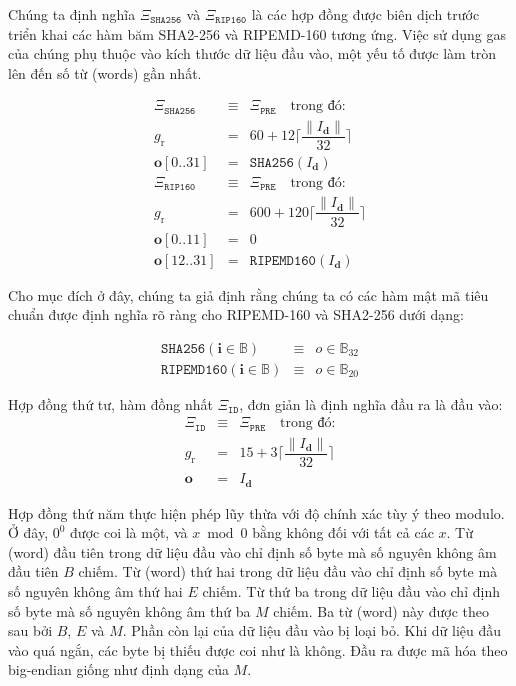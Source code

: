 \documentclass[9pt,oneside]{amsart}
\begin{document}
Chúng ta định nghĩa $\Xi_{\mathtt{SHA256}}$ và $\Xi_{\mathtt{RIP160}}$ là các hợp đồng được biên dịch trước triển khai các hàm băm SHA2-256 và RIPEMD-160 tương ứng. Việc sử dụng gas của chúng phụ thuộc vào kích thước dữ liệu đầu vào, một yếu tố được làm tròn lên đến số từ (words) gần nhất.

\begin{eqnarray}
\Xi_{\mathtt{SHA256}} &\equiv& \Xi_{\mathtt{PRE}} \quad \text{trong đó:} \\
g_{\mathrm{r}} &=& 60 + 12\Big\lceil \dfrac{\lVert I_{\mathbf{d}} \rVert}{32} \Big\rceil\\
\mathbf{o}[0..31] &=& \mathtt{SHA256}(I_{\mathbf{d}})\\
\Xi_{\mathtt{RIP160}} &\equiv& \Xi_{\mathtt{PRE}} \quad \text{trong đó:} \\
g_{\mathrm{r}} &=& 600 + 120\Big\lceil \dfrac{\lVert I_{\mathbf{d}} \rVert}{32} \Big\rceil\\
\mathbf{o}[0..11] &=& 0 \\
\mathbf{o}[12..31] &=& \mathtt{RIPEMD160}(I_{\mathbf{d}})
\end{eqnarray}

Cho mục đích ở đây, chúng ta giả định rằng chúng ta có các hàm mật mã tiêu chuẩn được định nghĩa rõ ràng cho RIPEMD-160 và SHA2-256 dưới dạng:

\begin{eqnarray}
\mathtt{SHA256}(\mathbf{i} \in \mathbb{B}) & \equiv & o \in \mathbb{B}_{32} \\
\mathtt{RIPEMD160}(\mathbf{i} \in \mathbb{B}) & \equiv & o \in \mathbb{B}_{20}
\end{eqnarray}

Hợp đồng thứ tư, hàm đồng nhất $\Xi_{\mathtt{ID}}$, đơn giản là định nghĩa đầu ra là đầu vào:
\begin{eqnarray}
\Xi_{\mathtt{ID}} &\equiv& \Xi_{\mathtt{PRE}} \quad \text{trong đó:} \\
g_{\mathrm{r}} &=& 15 + 3\Big\lceil \dfrac{\lVert I_{\mathbf{d}} \rVert}{32} \Big\rceil\\
\mathbf{o} &=& I_{\mathbf{d}}
\end{eqnarray}

Hợp đồng thứ năm thực hiện phép lũy thừa với độ chính xác tùy ý theo modulo. Ở đây, $0 ^ 0$ được coi là một, và $x \bmod 0$ bằng không đối với tất cả các $x$. Từ (word) đầu tiên trong dữ liệu đầu vào chỉ định số byte mà số nguyên không âm đầu tiên $B$ chiếm. Từ (word) thứ hai trong dữ liệu đầu vào chỉ định số byte mà số nguyên không âm thứ hai $E$ chiếm. Từ thứ ba trong dữ liệu đầu vào chỉ định số byte mà số nguyên không âm thứ ba $M$ chiếm. Ba từ (word) này được theo sau bởi $B$, $E$ và $M$. Phần còn lại của dữ liệu đầu vào bị loại bỏ. Khi dữ liệu đầu vào quá ngắn, các byte bị thiếu được coi như là không. Đầu ra được mã hóa theo big-endian giống như định dạng của $M$.
\end{document}
